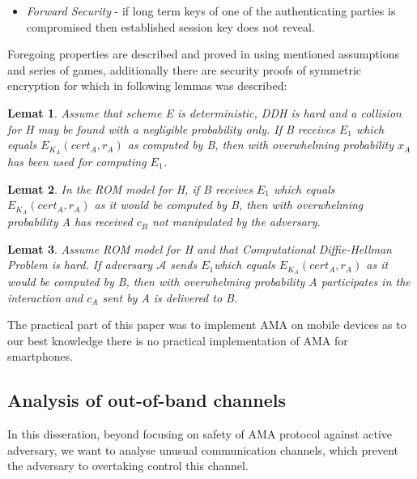 \documentclass[11pt,titlepage]{article}
\theoremstyle{plain}
\newtheorem{theorem}{Theorem}
\newtheorem{lemma}{Lemat}[section]
\begin{document}
\begin{itemize}
 	\begin{theorem}
 	For AMA, $\textbf{Adv}(\mathcal{A}^{bind})$ is negligibly small, assuming hardness of DDH Problem and ROM model for H.  
 	\end{theorem}
 	
 	The second case considers that the adversary has access to some interactions between Alice and Bob (allegedly). For more details see \cite{AMA}.
 	
 	\item \textit{Forward Security} - if long term keys of one of the authenticating parties is compromised then established session key does not reveal.
 	

 \end{itemize}

\vspace{5mm}

Foregoing properties are described and proved in \cite{AMA} using mentioned assumptions and series of games, additionally there are security proofs of symmetric encryption for which in \cite{AMA} following lemmas was described:

\begin{lemma}
Assume that scheme E is deterministic, DDH is hard and a collision for H may be found with a negligible probability only. If B receives $E_1$ which equals $E_{K_A}(cert_A, r_A)$ as computed by B, then with overwhelming probability $x_A$ has been used for computing $E_1$.
\end{lemma}

\begin{lemma}
In the ROM model for H, if B receives $E_1$ which equals $E_{K_A}(cert_A,r_A)$ as it would  be computed by B, then with overwhelming probability A has received $c_B$ not manipulated by the adversary.
\end{lemma}

\begin{lemma}
Assume ROM model for H and that Computational Diffie-Hellman Problem is hard. If adversary $\mathcal{A}$ sends $E_1$which equals $E_{K_A}(cert_A, r_A)$ as it would be computed by B, then with overwhelming probability A participates in the interaction and $c_A$ sent by A is delivered to B.
\end{lemma}

The practical part of this paper was to implement AMA on mobile devices as to our best knowledge there is no practical implementation of AMA for smartphones.

\subsection{Analysis of out-of-band channels}
In this disseration, beyond focusing on safety of AMA protocol against active adversary, we want to analyse unusual communication channels, which prevent the adversary to overtaking control this channel.
\end{document}
